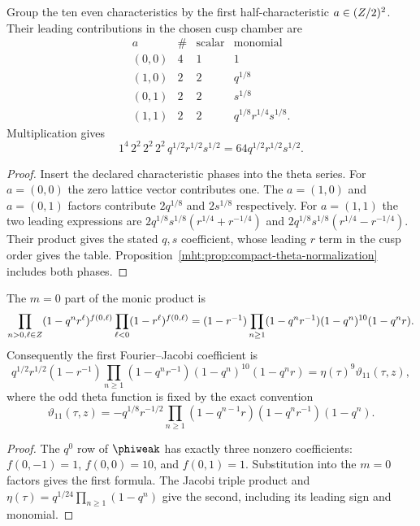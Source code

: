 \begin{proposition}
Group the ten even characteristics by the first half-characteristic $a\in(Z/2)^2$. Their leading contributions in the chosen cusp chamber are
\[
\begin{array}{c|c|c|c}
a&\#&\text{scalar}&\text{monomial}\\ \hline
(0,0)&4&1&1\\
(1,0)&2&2&q^{1/8}\\
(0,1)&2&2&s^{1/8}\\
(1,1)&2&2&q^{1/8}r^{1/4}s^{1/8}.
\end{array}
\]
Multiplication gives
\[
 1^4\,2^2\,2^2\,2^2\,
 q^{1/2}r^{1/2}s^{1/2}
 =64q^{1/2}r^{1/2}s^{1/2}.
\]
\end{proposition}
\begin{proof}
Insert the declared characteristic phases into the theta series.
For $a=(0,0)$ the zero lattice vector contributes one.
The $a=(1,0)$ and $a=(0,1)$ factors contribute $2q^{1/8}$ and $2s^{1/8}$ respectively.
For $a=(1,1)$ the two leading expressions are
$2q^{1/8}s^{1/8}(r^{1/4}+r^{-1/4})$ and
$2q^{1/8}s^{1/8}(r^{1/4}-r^{-1/4})$.
Their product gives the stated $q,s$ coefficient, whose leading $r$ term in the cusp order gives the table.
Proposition~\ref{mht:prop:compact-theta-normalization} includes both phases.
\end{proof}

\begin{proposition}
The $m=0$ part of the monic product is
\[
 \prod_{n>0,\ell\in Z}(1-q^nr^\ell)^{f(0,\ell)}
 \prod_{\ell<0}(1-r^\ell)^{f(0,\ell)}
 =(1-r^{-1})\prod_{n\ge1}
 (1-q^nr^{-1})(1-q^n)^{10}(1-q^nr).
\]
Consequently the first Fourier--Jacobi coefficient is
\[
 q^{1/2}r^{1/2}(1-r^{-1})
 \prod_{n\ge1}(1-q^nr^{-1})(1-q^n)^{10}(1-q^nr)
 =\eta(\tau)^9\vartheta_{11}(\tau,z),
\]
where the odd theta function is fixed by the exact convention
\[
 \vartheta_{11}(\tau,z)
 =-q^{1/8}r^{-1/2}
 \prod_{n\ge1}(1-q^{n-1}r)(1-q^nr^{-1})(1-q^n).
\]
\end{proposition}
\begin{proof}
The $q^0$ row of $\phiweak$ has exactly three nonzero coefficients:
$f(0,-1)=1$, $f(0,0)=10$, and $f(0,1)=1$. Substitution into the $m=0$ factors gives the first formula. The Jacobi triple product and $\eta(\tau)=q^{1/24}\prod_{n\ge1}(1-q^n)$ give the second, including its leading sign and monomial.
\end{proof}

